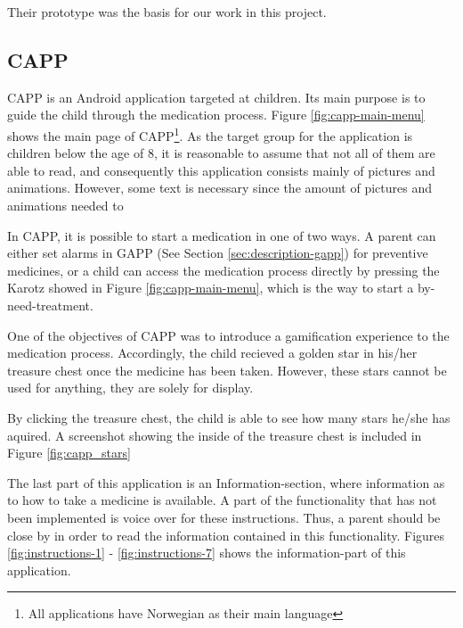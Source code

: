 Their prototype was the basis for our work in this project. 


\subsection{CAPP}
\label{sec:description-capp}
CAPP is an Android application targeted at children. Its main purpose is to guide the child through the medication process. Figure \ref{fig:capp-main-menu} shows the main page of CAPP\footnote{All applications have Norwegian as their main language}.  
As the target group for the application is children below the age of 8, it is reasonable to assume that not all of them are able to read, and consequently this application consists mainly of pictures and animations. However, some text is necessary since the amount of pictures and animations needed to 


In CAPP, it is possible to start a medication in one of two ways. A parent can either set alarms in GAPP (See Section \ref{sec:description-gapp}) for preventive medicines, or a child can access the medication process directly by pressing the Karotz showed in Figure \ref{fig:capp-main-menu}, which is the way to start a by-need-treatment. 


One of the objectives of CAPP was to introduce a gamification experience to the medication process. Accordingly, the child recieved a golden star in his/her treasure chest once the medicine has been taken. However, these stars cannot be used for anything, they are solely for display.
  

By clicking the treasure chest, the child is able to see how many stars he/she has aquired. A screenshot showing the inside of the treasure chest is included in Figure \ref{fig:capp_stars} 


The last part of this application is an Information-section, where information as to how to take a medicine is available. A part of the functionality that has not been implemented is voice over for these instructions. Thus, a parent should be close by in order to read the information contained in this functionality.     
Figures \ref{fig:instructions-1} - \ref{fig:instructions-7} shows the information-part of this application.



